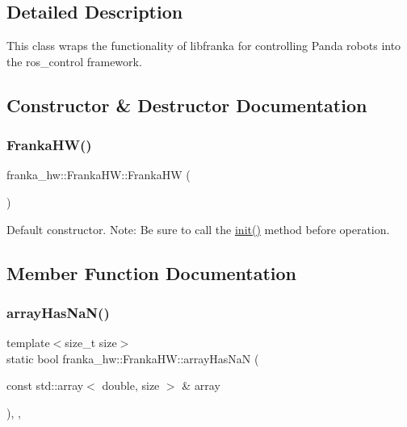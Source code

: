 \subsection{Detailed Description}
This class wraps the functionality of libfranka for controlling Panda robots into the ros\+\_\+control framework. 

\subsection{Constructor \& Destructor Documentation}
\mbox{\label{classfranka__hw_1_1_franka_h_w_abca52ce19bfa28709efcfe8d0d6404b8}} 
\subsubsection{\texorpdfstring{Franka\+H\+W()}{FrankaHW()}}
{\footnotesize\ttfamily franka\+\_\+hw\+::\+Franka\+H\+W\+::\+Franka\+HW (\begin{DoxyParamCaption}{ }\end{DoxyParamCaption})}

Default constructor. Note\+: Be sure to call the \hyperlink{classfranka__hw_1_1_franka_h_w_a0323c9d759de8d6ab8fae4bf574e4a48}{init()} method before operation. 

\subsection{Member Function Documentation}
\mbox{\label{classfranka__hw_1_1_franka_h_w_a6adcd4d0cf60dd255bfea0d80791fcc7}} 
\subsubsection{\texorpdfstring{array\+Has\+Na\+N()}{arrayHasNaN()}}
{\footnotesize\ttfamily template$<$size\+\_\+t size$>$ \\
static bool franka\+\_\+hw\+::\+Franka\+H\+W\+::array\+Has\+NaN (\begin{DoxyParamCaption}\item[{const std\+::array$<$ double, size $>$ \&}]{array }\end{DoxyParamCaption})\hspace{0.3cm}{\ttfamily [inline]}, {\ttfamily [static]}, {\ttfamily [protected]}}

